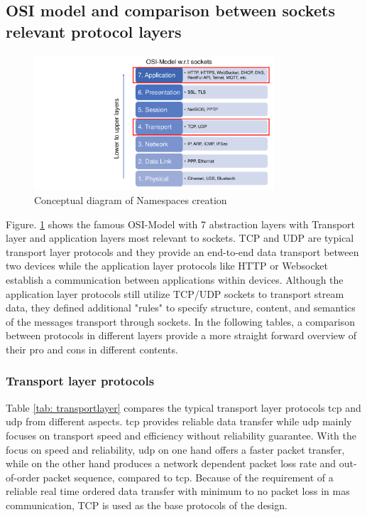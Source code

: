 \subsection{OSI model and comparison between sockets relevant protocol layers}
\begin{figure}[htbp]
\includegraphics[width=0.8\textwidth]{figures/OSI.pdf}
\centering
\caption{Conceptual diagram of Namespaces creation\label{fig: OSI}}
\end{figure}

Figure. \ref{fig: OSI} shows the famous OSI-Model with 7 abstraction layers with Transport layer and application layers most relevant to sockets. 
TCP and UDP are typical transport layer protocols and they provide an end-to-end data transport between two devices while the application layer protocols like HTTP or Websocket establish a communication between applications within devices. 
Although the application layer protocols still utilize TCP/UDP sockets to transport stream data, they defined additional "rules" to specify structure, content, and semantics of the messages transport through sockets. 
In the following tables, a comparison between protocols in different layers provide a more straight forward overview of their pro and cons in different contents.


\subsubsection{Transport layer protocols}


Table \ref{tab: transportlayer} compares the typical transport layer protocols \gls{tcp} and \gls{udp} from different aspects.  
\gls{tcp} provides reliable data transfer while \gls{udp} mainly focuses on transport speed and efficiency without reliability guarantee. 
With the focus on speed and reliability, \gls{udp} on one hand offers a faster packet transfer, while on the other hand produces a network dependent packet loss rate and out-of-order packet sequence, compared to \gls{tcp}. 
Because of the requirement of a reliable real time ordered data transfer with minimum to no packet loss in \gls{mas} communication, TCP is used as the base protocols of the design. 


